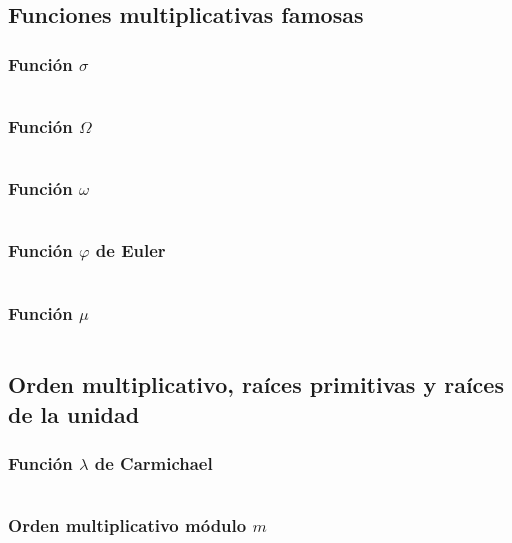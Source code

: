 \documentclass[11pt]{article}
\begin{document}
		\subsection{Funciones multiplicativas famosas}
			\subsubsection{Función $\sigma$}
			\inputminted[tabsize=2,breaklines,firstline=218,lastline=235,fontsize=\small]{c++}{numberTheory.cpp}
			
			\subsubsection{Función $\Omega$}
			\inputminted[tabsize=2,breaklines,firstline=237,lastline=245,fontsize=\small]{c++}{numberTheory.cpp}
			
			\subsubsection{Función $\omega$}
			\inputminted[tabsize=2,breaklines,firstline=247,lastline=255,fontsize=\small]{c++}{numberTheory.cpp}
			
			\subsubsection{Función $\varphi$ de Euler}
			\inputminted[tabsize=2,breaklines,firstline=262,lastline=270,fontsize=\small]{c++}{numberTheory.cpp}
			
			\subsubsection{Función $\mu$}
			\inputminted[tabsize=2,breaklines,firstline=288,lastline=299,fontsize=\small]{c++}{numberTheory.cpp}
			
		\subsection{Orden multiplicativo, raíces primitivas y raíces de la unidad}
			\subsubsection{Función $\lambda$ de Carmichael}
			\inputminted[tabsize=2,breaklines,firstline=272,lastline=286,fontsize=\small]{c++}{numberTheory.cpp}
			
			\subsubsection{Orden multiplicativo módulo $m$}
			\inputminted[tabsize=2,breaklines,firstline=301,lastline=317,fontsize=\small]{c++}{numberTheory.cpp}
			
\end{document}
